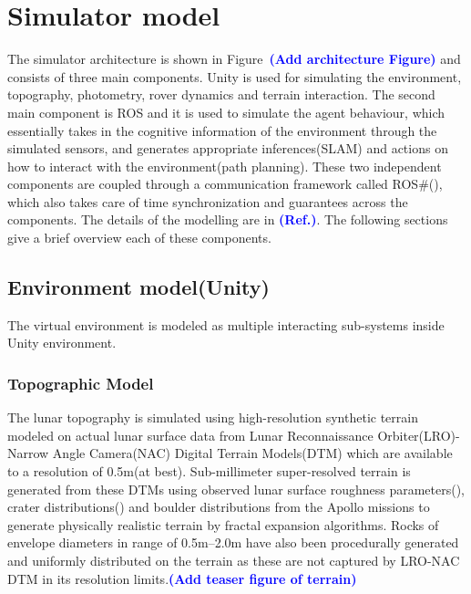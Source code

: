 \documentclass[a4paper, 10pt, conference]{ieeeconf}      %
\newcommand\coltxt[2]{\textbf{\textcolor{#1}{(#2)}}}
\newcommand\msm[1]{\coltxt{blue}{#1}}
\begin{document}
\section{Simulator model}
The simulator architecture is shown in Figure~\msm{Add architecture Figure} and consists of three main components. Unity is used for simulating the environment, topography, photometry, rover dynamics and terrain interaction. The second main component is ROS and it is used to simulate the agent behaviour, which essentially takes in the cognitive information of the environment through the simulated sensors, and generates appropriate inferences(SLAM) and actions on how to interact with the environment(path planning). These two independent components are coupled through a communication framework called ROS\#(\cite{bischoffm_2019_06}), which also takes care of time synchronization and guarantees across the components. The details of the modelling are in \msm{Ref.}. The following sections give a brief overview each of these components.
\subsection{Environment model(Unity)}
The virtual environment is modeled as multiple interacting sub-systems inside Unity environment.
\subsubsection{Topographic Model}
The lunar topography is simulated using high-resolution synthetic terrain modeled on actual lunar surface data from Lunar Reconnaissance Orbiter(LRO)-Narrow Angle Camera(NAC) Digital Terrain Models(DTM) which are available to a resolution of 0.5m(at best). Sub-millimeter super-resolved terrain is generated from these DTMs using observed lunar surface roughness parameters(\cite{manned1971analysis,rowan1971lunar}), crater distributions(\cite{neukum1975study,heiken1991lunar}) and boulder distributions \cite{watkins2018boulder} from the Apollo missions to generate physically realistic terrain by fractal expansion algorithms. Rocks of envelope diameters in range of 0.5m--2.0m have also been procedurally generated and uniformly distributed on the terrain as these are not captured by LRO-NAC DTM in its resolution limits.\msm{Add teaser figure of terrain}
\end{document}
